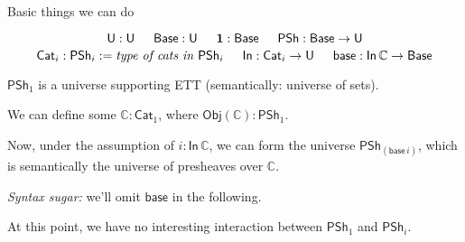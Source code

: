 \documentclass[dvipsnames,aspectratio=169]{beamer}
\newcommand{\ms}[1]{\mathsf{#1}}
\newcommand{\mbb}[1]{\mathbb{#1}}
\newcommand{\mbf}[1]{\mathbf{#1}}
\newcommand{\U}{\mathsf{U}}
\newcommand{\Base}{\mathsf{Base}}
\newcommand{\In}{\mathsf{In}}
\newcommand{\PSh}{\mathsf{PSh}}
\newcommand{\Cat}{\mathsf{Cat}}
\newcommand{\base}{\mathsf{base}}
\newcommand{\mbbC}{\mbb{C}}
\begin{document}
\begin{frame}{Basic things we can do}
\begin{block}{}
\vspace{-0.6em}
{\footnotesize
  \[ \U : \U \hspace{1.5em} \Base : \U \hspace{1.5em} \mbf{1} : \Base \hspace{1.5em} \PSh : \Base \to \U \]
  \[ \Cat_i : \PSh_i := \text{\emph{type of cats in $\PSh_i$}} \hspace{1.5em} \In : \Cat_i \to \U \hspace{1.5em} \base : \In\,\mbbC \to \Base \]
}
\end{block}
\vspace{1em}

$\PSh_1$ is a universe supporting ETT (semantically: universe of sets).
\vspace{1em}
\pause

We can define some $\mbbC : \Cat_1$, where $\ms{Obj}(\mbbC) : \PSh_1$.
\vspace{1em}
\pause

Now, \alert{under the assumption} of $i : \In\,\mbbC$, we can form the universe $\PSh_{(\base\,i)}$, which is semantically the universe of
presheaves over $\mbbC$.
\vspace{1em}
\pause

\emph{Syntax sugar:} we'll omit $\base$ in the following.
\vspace{1em}

At this point, we have no interesting interaction between $\PSh_1$ and $\PSh_i$.
\vspace{3em}

\end{frame}
\end{document}
